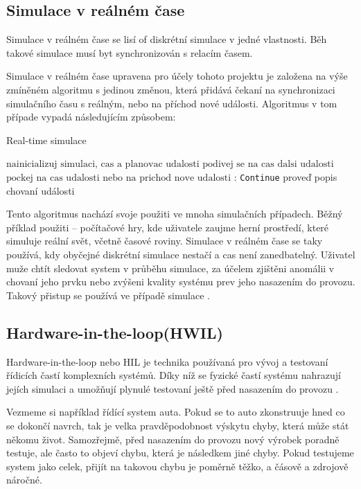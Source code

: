 \subsection{Simulace v reálném čase}
\label{subsec:real-time-sim}
Simulace v reálném čase se lisí of diskrétní simulace v jedné vlastnosti. Běh takové simulace musí byt synchronizován s relacím časem. 

Simulace v reálném čase upravena pro účely tohoto projektu je založena na výše zmíněném algoritmu  s jedinou změnou, která přidává čekaní na synchronizaci simulačního času s reálným, nebo na příchod nové události. Algoritmus v tom případe vypadá následujícím způsobem:

\begin{algorithm}
\caption{Real-time simulace}\label{euclid}
\begin{algorithmic}[1]
\State $\text{nainicializuj simulaci, cas a planovac udalosti}$
\State $\text{podivej se na cas dalsi udalosti}$
\Return
\EndIf
\State $\text{pockej na cas udalosti nebo na prichod nove udalosti}$
:
    \State \texttt{Continue}
\EndIf
\State proveď popis chovaní události
\EndWhile
\end{algorithmic}
\end{algorithm}

Tento algoritmus nachází svoje použiti ve mnoha simulačních případech. Běžný příklad použiti -- počítačové hry, kde uživatele zaujme herní prostředí, které simuluje reální svět, včetně časové roviny. Simulace v reálném čase se taky používá, kdy obyčejné diskrétní simulace nestačí a cas není zanedbatelný. Uživatel muže chtít sledovat system v průběhu simulace, za účelem zjištěni anomálii v chovaní jeho prvku nebo zvýšeni kvality systému prev jeho nasazením do provozu. Takový přistup se používá ve případě simulace \hyperref[subsec:hwil]{}.

\subsection{Hardware-in-the-loop(HWIL)}
\label{subsec:hwil}

Hardware-in-the-loop nebo HIL je technika používaná pro vývoj a testovaní řídicích častí komplexních systémů. Díky níž se fyzické častí systému nahrazují jejích simulaci a umožňují plynulé testovaní ještě před nasazením do provozu \cite{hil}.

Vezmeme si například řídící system auta. Pokud se to auto zkonstruuje hned co se dokončí navrch, tak je velka pravděpodobnost výskytu chyby, která může stát někomu život. Samozřejmě, před nasazením do provozu nový výrobek poradně testuje, ale často to objeví chybu, která je následkem jiné chyby. Pokud testujeme system jako celek, přijít na takovou chybu je poměrně těžko, a čásově a zdrojově náročné.

